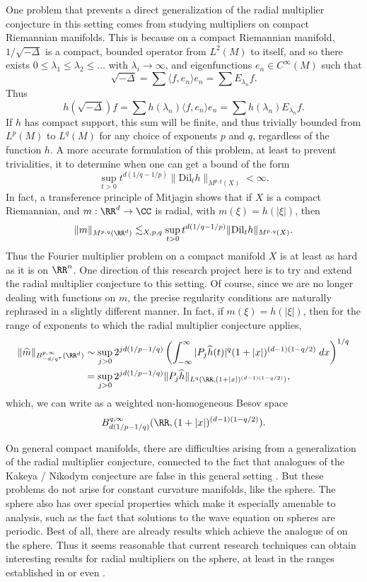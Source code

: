 One problem that prevents a direct generalization of the radial multiplier conjecture in this setting comes from studying multipliers on compact Riemannian manifolds. This is because on a compact Riemannian manifold, $1 / \sqrt{-\Delta}$ is a compact, bounded operator from $L^2(M)$ to itself, and so there exists $0 \leq \lambda_1 \leq \lambda_2 \leq \dots$ with $\lambda_i \to \infty$, and eigenfunctions $e_n \in C^\infty(M)$ such that
%
\[ \sqrt{-\Delta} = \sum \langle f, e_n \rangle e_n = \sum E_{\lambda_n} f. \]
%
Thus
%
\[ h \left( \sqrt{-\Delta} \right) f = \sum h(\lambda_n) \langle f, e_n \rangle e_n = \sum h(\lambda_n) E_{\lambda_n} f. \]
%
If $h$ has compact support, this sum will be finite, and thus trivially bounded from $L^p(M)$ to $L^q(M)$ for any choice of exponents $p$ and $q$, regardless of the function $h$. A more accurate formulation of this problem, at least to prevent trivialities, it to determine when one can get a bound of the form
%
\[ \sup_{t > 0} t^{d(1/q - 1/p)} \| \text{Dil}_t h \|_{M^{p,q}(X)} < \infty. \]
%
In fact, a transference principle of Mitjagin \cite{Mitjagin} shows that if $X$ is a compact Riemannian, and $m: \RR^d \to \CC$ is radial, with $m(\xi) = h(|\xi|)$, then
%
\[ \| m \|_{M^{p,q}(\RR^d)} \lesssim_{X,p,q} \sup_{t > 0} t^{d(1/q - 1/p)} \| \text{Dil}_t h \|_{M^{p,q}(X)}. \]
%
Thus the Fourier multiplier problem on a compact manifold $X$ is at least as hard as it is on $\RR^n$. One direction of this research project here is to try and extend the radial multiplier conjecture to this setting. Of course, since we are no longer dealing with functions on $m$, the precise regularity conditions are naturally rephrased in a slightly different manner. In fact, if $m(\xi) = h(|\xi|)$, then for the range of exponents to which the radial multiplier conjecture applies,
%
\begin{align*}
    \| \widehat{m} \|_{B^{p,\infty}_{-d/q^*}(\RR^d)} &\sim \sup_{j > 0} 2^{jd(1/p - 1/q)} \left( \int_{-\infty}^\infty |P_j \widehat{h}(t)|^q (1 + |x|)^{(d-1)(1 - q/2)}\; dx \right)^{1/q}\\
    &= \sup_{j > 0} 2^{jd(1/p-1/q)} \| P_j \widehat{h} \|_{L^q(\RR, (1 + |x|)^{(d-1)(1 - q/2)})},
\end{align*}
%
which, we can write as a weighted non-homogeneous Besov space
%
\[ B^{q,\infty}_{d(1/p - 1/q)}(\RR, (1 + |x|)^{(d-1)(1-q/2)}). \]

On general compact manifolds, there are difficulties arising from a generalization of the radial multiplier conjecture, connected to the fact that analogues of the Kakeya / Nikodym conjecture are false in this general setting \cite{Minicozzi}. But these problems do not arise for constant curvature manifolds, like the sphere. The sphere also has over special properties which make it especially amenable to analysis, such as the fact that solutions to the wave equation on spheres are periodic. Best of all, there are already results which achieve the analogue of \cite{GarrigosandSeeger} on the sphere. Thus it seems reasonable that current research techniques can obtain interesting results for radial multipliers on the sphere, at least in the ranges established in \cite{HeoandNazarovandSeeger} or even \cite{Cladek}.

